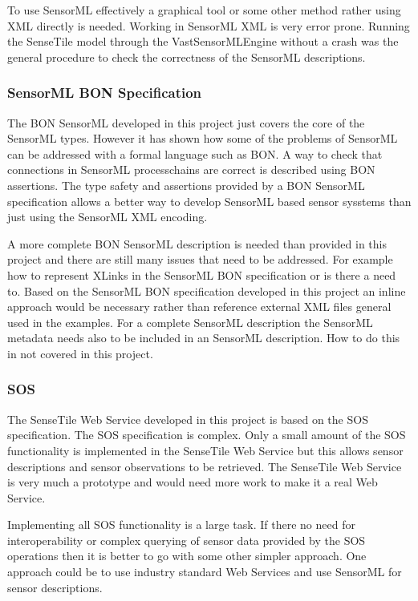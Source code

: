 \documentclass[]{final_report}
\begin{document}
To use SensorML effectively a graphical tool or some other method rather using XML directly is needed. Working in SensorML XML is very error prone. Running the SenseTile model through the VastSensorMLEngine without a crash was the general procedure to check the correctness of the SensorML descriptions. 

\subsubsection{SensorML BON Specification}
The BON SensorML developed in this project just covers the core of the SensorML types. However it has shown how some of the problems of SensorML can be addressed with a formal language such as BON. A way to check that connections in SensorML processchains are correct is described using BON assertions. The type safety and assertions provided by a BON SensorML specification allows a better way to develop SensorML based sensor sysstems than just using the SensorML XML encoding.

A more complete BON SensorML description is needed than provided in this project and there are still many issues that need to be addressed. For example how to represent XLinks in the SensorML BON specification or is there a need to. Based on the SensorML BON specification developed in this project an inline approach would be necessary rather than reference external XML files general used in the examples. For a complete SensorML description the SensorML metadata needs also to be included in an SensorML description. How to do this in not covered in this project. 

\subsubsection{SOS}
The SenseTile Web Service developed in this project is based on the SOS specification. The SOS specification is complex. Only a small amount of the SOS functionality is implemented in the SenseTile Web Service but this allows sensor descriptions and sensor observations to be retrieved. The SenseTile Web Service is very much a prototype and would need more work to make it a real Web Service.

Implementing all SOS functionality is a large task. If there no need for interoperability or complex querying of sensor data provided by the SOS operations then it is better to go with some other simpler approach. One approach could be to use industry standard Web Services and use SensorML for sensor descriptions.
\end{document}
